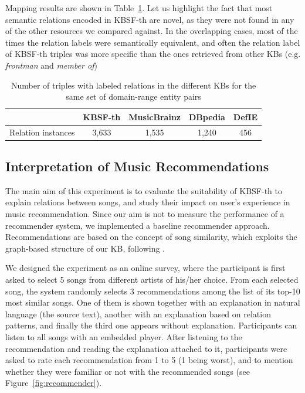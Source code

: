 Mapping results are shown in Table~\ref{tbl:coverage}. Let us highlight the fact that most semantic relations encoded in \textsc{KBSF}-th are novel, as they were not found in any of the other resources we compared against. In the overlapping cases, most of the times the relation labels were semantically equivalent, and often the relation label of \textsc{KBSF}-th triples was more specific than the ones retrieved from other \textsc{KB}s (e.g. \textit{frontman} and \textit{member of})

\begin{table}[ht!]
\scriptsize
\centering
	\begin{tabular}{ | c | c | c | c | c |}
	\hline
	& KBSF-th & MusicBrainz & DBpedia & DefIE \\
	\hline
	Relation instances & 3,633 & 1,535 & 1,240 & 456 \\
	\hline
	\end{tabular}
	\caption{Number of triples with labeled relations in the different KBs for the same set of domain-range entity pairs}
	\label{tbl:coverage}
\end{table}



\subsection{Interpretation of Music Recommendations}\label{music_recommendation}

The main aim of this experiment is to evaluate the suitability of \textsc{KBSF}-th to explain relations between songs, and study their impact on user's experience in music recommendation. 
Since our aim is not to measure the performance of a recommender system, we implemented a baseline recommender approach. Recommendations are based on the concept of song similarity, which exploits the graph-based structure of our \textsc{KB}, following \cite{Oramas2015a}.


We designed the experiment as an online survey, where the participant is first asked to select 5 songs from different artists of his/her choice. From each selected song, the system randomly selects 3 recommendations among the list of its top-10 most similar songs. One of them is shown together with an explanation in natural language (the source text), another with an explanation based on relation patterns, and finally the third one appears without explanation.
Participants can listen to all songs with an embedded player. After listening to the recommendation and reading the explanation attached to it, participants were asked to rate each recommendation from 1 to 5 (1 being worst), and to mention whether they were familiar or not with the recommended songs (see Figure~\ref{fig:recommender}).


